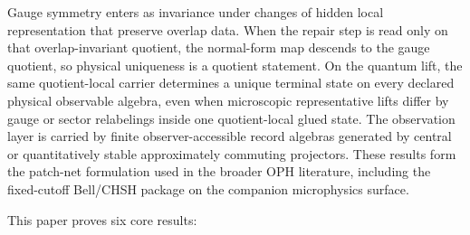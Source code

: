 \documentclass[11pt]{article}
\theoremstyle{remark}
\theoremstyle{plain}
\begin{document}
Gauge symmetry enters as invariance under changes of hidden local representation that preserve
overlap data. When the repair step is read only on that overlap-invariant quotient, the
normal-form map descends to the gauge quotient, so physical uniqueness is a quotient statement.
On the quantum lift, the same quotient-local carrier determines a unique terminal state on every
declared physical observable algebra, even when microscopic representative lifts differ by gauge
or sector relabelings inside one quotient-local glued state.
The observation layer is carried by finite observer-accessible record algebras generated by
central or quantitatively stable approximately commuting projectors. These results form the
patch-net formulation used in the broader OPH literature, including the fixed-cutoff Bell/CHSH
package on the companion microphysics surface.

This paper proves six core results:
\end{document}
